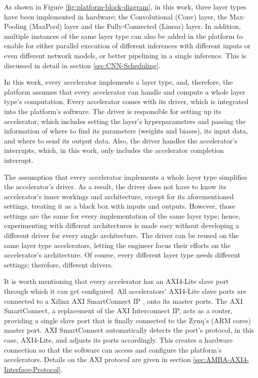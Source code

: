 As shown in Figure \ref{fig:platform-block-diagram}, in this work, three layer types have been implemented in hardware; the Convolutional (Conv) layer, the Max-Pooling (MaxPool) layer and the Fully-Connected (Linear) layer. In addition, multiple instances of the same layer type can also be added in the platform to enable for either parallel execution of different inferences with different inputs or even different network models, or better pipelining in a single inference. This is discussed in detail in section \ref{sec:CNN-Scheduling}.

In this work, every accelerator implements a layer type, and, therefore, the platform assumes that every accelerator can handle and compute a whole layer type's computation. Every accelerator comes with its driver, which is integrated into the platform's software. The driver is responsible for setting up its accelerator, which includes setting the layer's hyperparameters and passing the information of where to find its parameters (weights and biases), its input data, and where to send its output data. Also, the driver handles the accelerator's interrupts, which,  in this work, only includes the accelerator completion interrupt.

The assumption that every accelerator implements a whole layer type simplifies the accelerator's driver. As a result, the driver does not have to know its accelerator's inner workings and architecture, except for its aforementioned settings, treating it as a black box with inputs and outputs. However, those settings are the same for every implementation of the same layer type; hence, experimenting with different architectures is made easy without developing a different driver for every single architecture. The driver can be reused on the same layer type accelerators, letting the engineer focus their efforts on the accelerator's architecture. Of course, every different layer type needs different settings; therefore, different drivers.

It is worth mentioning that every accelerator has an AXI4-Lite \cite{UG1037-Vivado-Design-Suite-AXI-Reference-Guide} slave port through which it can get configured. All accelerators' AXI4-Lite slave ports are connected to a Xilinx AXI SmartConnect IP \cite{PG247-SmartConnect-Product-Guide}, onto its master ports. The AXI SmartConnect, a replacement of the AXI Interconnect IP, acts as a router, providing a single slave port that is finally connected to the Zynq's (ARM cores) master port. AXI SmartConnect automatically detects the port's protocol, in this case, AXI4-Lite, and adjusts its ports accordingly. This creates a hardware connection so that the software can access and configure the platform's accelerators. Details on the AXI protocol are given in section \ref{sec:AMBA-AXI4-Interface-Protocol}.


